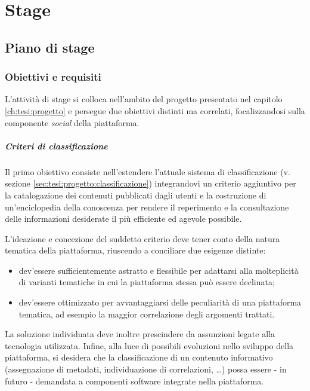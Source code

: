 \chapter{Stage}
\label{ch:tesi:stage}

\section{Piano di stage}
\label{sec:tesi:stage:piano}

\subsection{Obiettivi e requisiti}
\label{sec:tesi:stage:piano:obiettivi}
L'attività di stage si colloca nell'ambito del progetto presentato nel capitolo \ref{ch:tesi:progetto} e persegue due obiettivi distinti ma correlati, focalizzandosi sulla componente \textit{social} della piattaforma.

\paragraph{Criteri di classificazione}
Il primo obiettivo consiste nell'estendere l'attuale sistema di classificazione (v. sezione \ref{sec:tesi:progetto:classificazione}) integrandovi un criterio aggiuntivo per la catalogazione dei contenuti pubblicati dagli utenti e la costruzione di un'enciclopedia della conoscenza per rendere il reperimento e la consultazione delle informazioni desiderate il più efficiente ed agevole possibile.

L'ideazione e concezione del suddetto criterio deve tener conto della natura tematica della piattaforma, riuscendo a conciliare due esigenze distinte:
\begin{itemize}
\item dev'essere sufficientemente astratto e flessibile per adattarsi alla molteplicità di varianti tematiche in cui la piattaforma stessa può essere declinata;
\item dev'essere ottimizzato per avvantaggiarsi delle peculiarità di una piattaforma tematica, ad esempio la maggior correlazione degli argomenti trattati.
\end{itemize}

La soluzione individuata deve inoltre prescindere da assunzioni legate alla tecnologia utilizzata. Infine, alla luce di possibili evoluzioni nello sviluppo della piattaforma, si desidera che la classificazione di un contenuto informativo (assegnazione di metadati, individuazione di correlazioni, \ldots) possa essere - in futuro - demandata a componenti software integrate nella piattaforma.

